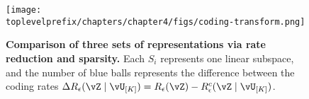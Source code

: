 \documentclass[\toplevelprefix/book-main.tex]{subfiles}
\begin{document}


\begin{figure}[t!]
     \centering
         \texttt{[image: \\toplevelprefix/chapters/chapter4/figs/coding-transform.png]}
     \caption{ \small\textbf{Comparison of three sets of  representations via rate reduction and sparsity.} Each $S_i$ represents one linear subspace, and the number of blue balls represents the difference between the coding rates $\Delta R_{\epsilon}(\vZ \mid \vU_{[K]}) = R_\epsilon(\vZ) - R^c_\epsilon(\vZ \mid \vU_{[K]})$. 
     }
        \label{fig:sparse-rate-reduction-diagram}
\end{figure}
\end{document}
